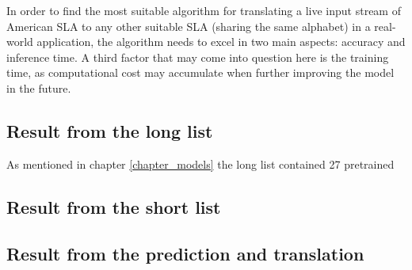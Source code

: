 In order to find the most suitable algorithm for translating a live input stream of American SLA to any other suitable SLA (sharing the same alphabet) in a real-world application, the algorithm needs to excel in two main aspects: accuracy and inference time. A third factor that may come into question here is the training time, as computational cost may accumulate when further improving the model in the future.

\subsection{Result from the long list}
As mentioned in chapter \ref{chapter_models} the long list contained 27 pretrained 


\subsection{Result from the short list}

\subsection{Result from the prediction and translation}
